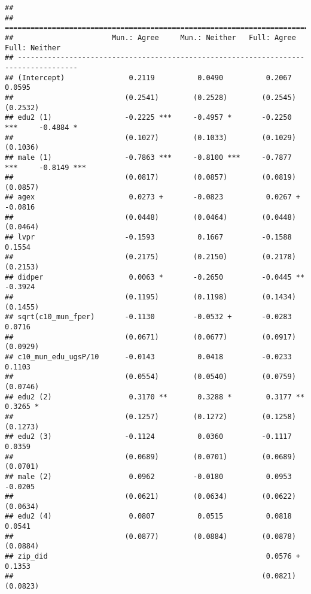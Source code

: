 \documentclass[
]{article}
\begin{document}
\begin{verbatim}
## 
## ====================================================================================
##                       Mun.: Agree     Mun.: Neither   Full: Agree     Full: Neither 
## ------------------------------------------------------------------------------------
## (Intercept)               0.2119          0.0490          0.2067          0.0595    
##                          (0.2541)        (0.2528)        (0.2545)        (0.2532)   
## edu2 (1)                 -0.2225 ***     -0.4957 *       -0.2250 ***     -0.4884 *  
##                          (0.1027)        (0.1033)        (0.1029)        (0.1036)   
## male (1)                 -0.7863 ***     -0.8100 ***     -0.7877 ***     -0.8149 ***
##                          (0.0817)        (0.0857)        (0.0819)        (0.0857)   
## agex                      0.0273 +       -0.0823          0.0267 +       -0.0816    
##                          (0.0448)        (0.0464)        (0.0448)        (0.0464)   
## lvpr                     -0.1593          0.1667         -0.1588          0.1554    
##                          (0.2175)        (0.2150)        (0.2178)        (0.2153)   
## didper                    0.0063 *       -0.2650         -0.0445 **      -0.3924    
##                          (0.1195)        (0.1198)        (0.1434)        (0.1455)   
## sqrt(c10_mun_fper)       -0.1130         -0.0532 +       -0.0283          0.0716    
##                          (0.0671)        (0.0677)        (0.0917)        (0.0929)   
## c10_mun_edu_ugsP/10      -0.0143          0.0418         -0.0233          0.1103    
##                          (0.0554)        (0.0540)        (0.0759)        (0.0746)   
## edu2 (2)                  0.3170 **       0.3288 *        0.3177 **       0.3265 *  
##                          (0.1257)        (0.1272)        (0.1258)        (0.1273)   
## edu2 (3)                 -0.1124          0.0360         -0.1117          0.0359    
##                          (0.0689)        (0.0701)        (0.0689)        (0.0701)   
## male (2)                  0.0962         -0.0180          0.0953         -0.0205    
##                          (0.0621)        (0.0634)        (0.0622)        (0.0634)   
## edu2 (4)                  0.0807          0.0515          0.0818          0.0541    
##                          (0.0877)        (0.0884)        (0.0878)        (0.0884)   
## zip_did                                                   0.0576 +        0.1353    
##                                                          (0.0821)        (0.0823)   

\end{verbatim}
\end{document}
